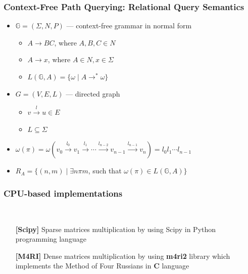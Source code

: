 \documentclass[xcolor=table]{beamer}
\begin{document}
  \begin{frame}[fragile]
    \frametitle{Context-Free Path Querying: Relational Query Semantics}
    \begin{itemize}
      \item $\mathbb{G} = (\Sigma, N, P)$ --- context-free grammar in normal form
      \begin{itemize}
        \item $A \rightarrow B C$, where $A, B, C \in N$
        \item $A \rightarrow x$, where $A \in N, x \in \Sigma$
        \item $L(\mathbb{G},A) = \{ \omega \mid A \rightarrow^* \omega \}$
      \end{itemize}
      \item $G = (V,E,L)$ --- directed graph
        \begin{itemize}
          \item $v \xrightarrow{l} u \in E$
          \item $L \subseteq \Sigma$
        \end{itemize}
      \item $\omega(\pi) = \omega(v_0 \xrightarrow{l_0} v_1 \xrightarrow{l_1} \cdots \xrightarrow{l_{n-2}} v_{n-1} \xrightarrow{l_{n-1}} v_n) = l_0 l_1 \cdots l_{n-1}$
      \item $R_A = \{ (n, m) \mid \exists n \pi m$, such that $\omega(\pi) \in L(\mathbb{G},A)\}$
    \end{itemize}
  \end{frame}


\begin{frame}[fragile] \frametitle{CPU-based implementations}
  \begin{minipage}[t]{1cm}
\hspace{1cm}
  \end{minipage}
  ~
\begin{minipage}[t]{0.85\textwidth}
\begin{itemize}
  \item[\textbf{[Scipy]}] Sparse matrices multiplication by using Scipy in Python programming language
\pause
  \item[\textbf{[M4RI]}] Dense matrices multiplication by using \textbf{m4ri2} library which implements the Method of Four Russians in \textbf{C} language
\end{itemize}
\end{minipage}
\end{frame}
\end{document}
